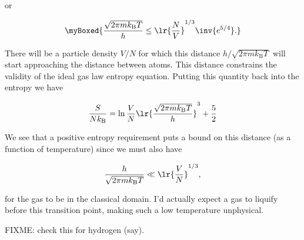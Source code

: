 {or

\begin{equation}\label{eqn:basicStatMechProblemSet4Problem1:140}
\myBoxed{
\frac{\sqrt{2 \pi m k_{\mathrm{B}} T}}{h} \le \lr{\frac{N}{V}}^{1/3} \inv{e^{5/4}}.
}
\end{equation}

There will be a particle density $V/N$ for which this distance $h/\sqrt{2 \pi m k_{\mathrm{B}} T}$ will start approaching the distance between atoms.  This distance constrains the validity of the ideal gas law entropy equation.  Putting this quantity back into the entropy  we have

\begin{equation}\label{eqn:basicStatMechProblemSet4Problem1:160}
\frac{S}{N k_{\mathrm{B}}} = \ln \frac{V}{N} \lr{\frac{\sqrt{2 \pi m k_{\mathrm{B}} T}}{h}}^3 + \frac{5}{2}
\end{equation}

We see that a positive entropy requirement puts a bound on this distance (as a function of temperature) since we must also have

\begin{equation}\label{eqn:basicStatMechProblemSet4Problem1:180}
\frac{h}{\sqrt{2 \pi m k_{\mathrm{B}} T}} \ll \lr{\frac{V}{N}}^{1/3},
\end{equation}

for the gas to be in the classical domain.  I'd actually expect a gas to liquify before this transition point, making such a low temperature unphysical.

FIXME: check this for hydrogen (say).
}
